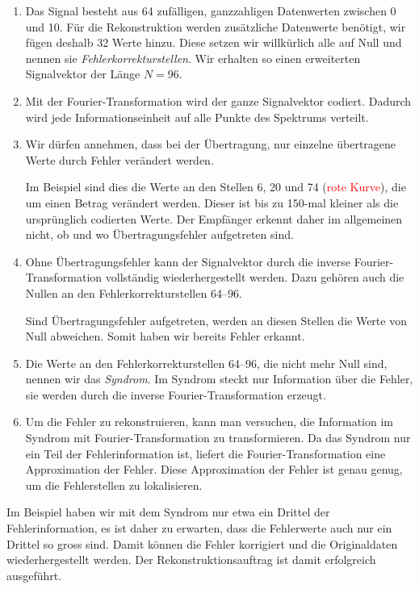 \begin{enumerate}[(1)]
 \item Das Signal besteht aus 64 zufälligen, ganzzahligen Datenwerten zwischen 0 und 10.
 Für die Rekonstruktion werden zusätzliche Datenwerte benötigt, wir fügen deshalb 32 Werte hinzu.
 Diese setzen wir willkürlich alle auf Null und nennen sie {\em Fehlerkorrekturstellen}.
%
 Wir erhalten so einen erweiterten Signalvektor der Länge $N =96$.
%
 \item Mit der Fourier-Transformation wird der ganze Signalvektor codiert.
 Dadurch wird jede Informationseinheit auf alle Punkte des Spektrums verteilt.
 \item Wir dürfen annehmen, dass bei der Übertragung, nur einzelne übertragene 
 	Werte durch Fehler verändert werden.
 \par 
 Im Beispiel sind dies die Werte an den Stellen 6, 20 und 74 (\textcolor{red}{rote Kurve}),
 	die um einen Betrag verändert werden.
 Dieser ist bis zu 150-mal kleiner als die ursprünglich codierten Werte. 
 Der Empfänger erkennt daher im allgemeinen nicht, ob und wo Übertragungsfehler aufgetreten sind.
 \item Ohne Übertragungsfehler kann der Signalvektor durch die inverse Fourier-Transformation vollständig
 	wiederhergestellt werden.
 Dazu gehören auch die Nullen an den Fehlerkorrekturstellen 64--96.
 \par 
 Sind Übertragungsfehler aufgetreten, werden an diesen Stellen die Werte von Null abweichen.
 Somit haben wir bereits Fehler erkannt.
 \item Die Werte an den Fehlerkorrekturstellen 64--96, die nicht mehr Null sind, nennen wir das {\em Syndrom}.
%
 Im Syndrom steckt nur Information über die Fehler, sie werden durch die inverse Fourier-Transformation erzeugt.
 \item Um die Fehler zu rekonstruieren, kann man versuchen, die Information im Syndrom mit Fourier-Transformation zu transformieren.
 Da das Syndrom nur ein Teil der Fehlerinformation ist, liefert die Fourier-Transformation eine Approximation der Fehler.
 Diese Approximation der Fehler ist genau genug, um die Fehlerstellen zu lokalisieren.
\end{enumerate}
Im Beispiel haben wir mit dem Syndrom nur etwa ein Drittel der Fehlerinformation, es ist daher zu erwarten, 
dass die Fehlerwerte auch nur ein Drittel so gross sind.
Damit können die Fehler korrigiert und die Originaldaten wiederhergestellt werden.
Der Rekonstruktionsauftrag ist damit erfolgreich ausgeführt.

